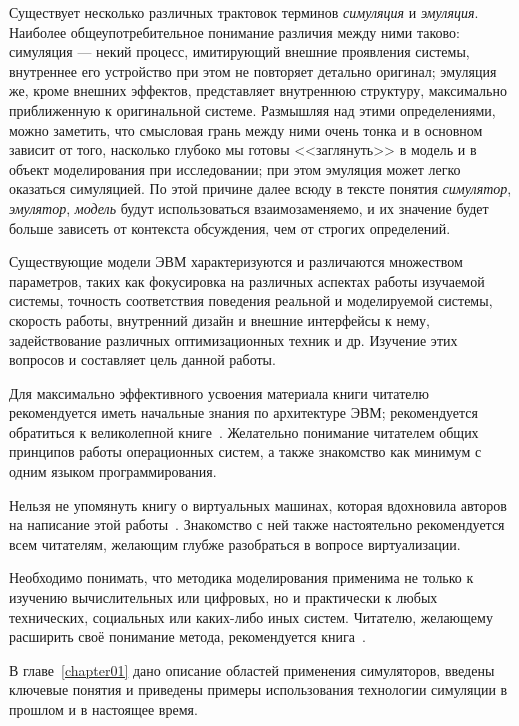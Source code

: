 Существует несколько различных трактовок терминов \textit{симуляция} и \textit{эмуляция}. Наиболее общеупотребительное понимание различия между ними таково: симуляция --- некий процесс, имитирующий внешние проявления системы, внутреннее его устройство при этом не повторяет детально оригинал; эмуляция же, кроме внешних эффектов, представляет внутреннюю структуру, максимально приближенную к оригинальной системе. Размышляя над этими определениями, можно заметить, что смысловая грань между ними очень тонка и в основном зависит от того, насколько глубоко мы готовы <<заглянуть>> в модель и в объект моделирования при исследовании; при этом эмуляция может легко оказаться симуляцией. По этой причине далее всюду в тексте понятия \textit{симулятор}, \textit{эмулятор}, \textit{модель} будут использоваться взаимозаменяемо, и их значение будет больше зависеть от контекста обсуждения, чем от строгих определений.

Существующие модели ЭВМ характеризуются и различаются множеством параметров, таких как фокусировка на различных аспектах работы изучаемой системы, точность соответствия поведения реальной и моделируемой системы, скорость работы, внутренний дизайн и внешние интерфейсы к нему, задействование различных оптимизационных техник и др. Изучение этих вопросов и составляет цель данной работы.

Для максимально эффективного усвоения материала книги читателю рекомендуется иметь начальные знания по архитектуре ЭВМ; рекомендуется обратиться к великолепной книге~\cite{patterson2012rus}. Желательно понимание читателем общих принципов работы операционных систем, а также знакомство как  минимум с одним языком программирования.

Нельзя не упомянуть книгу о виртуальных машинах, которая вдохновила авторов на написание этой работы~\cite{DBLP:books/daglib/0013597}. Знакомство с ней также настоятельно рекомендуется всем читателям, желающим глубже разобраться в вопросе виртуализации.

Необходимо понимать, что методика моделирования применима не только к изучению вычислительных или цифровых, но и практически к любых технических, социальных или каких-либо иных систем. Читателю, желающему расширить своё понимание метода, рекомендуется книга~\cite{system-modeling}.

В главе~\ref{chapter01} дано описание областей применения симуляторов, введены ключевые понятия и приведены примеры использования технологии симуляции в прошлом и в настоящее время.


